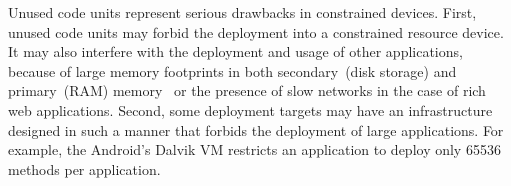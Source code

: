 %
%

Unused code units represent serious drawbacks in constrained devices. 
First, unused code units may forbid the deployment into a constrained resource device.
It may also interfere with the deployment and usage of other applications, because of large memory footprints in both secondary~(disk storage) and primary~(RAM) memory~\cite{Mart12a} or the presence of slow networks in the case of rich web applications.
Second, some deployment targets may have an infrastructure designed in such a manner that forbids the deployment of large applications. For example, the Android's Dalvik VM restricts an application to deploy only 65536 methods per application.


